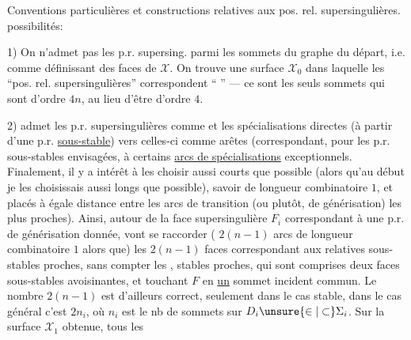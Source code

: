 Conventions particulières et constructions relatives aux pos. rel. supersingulières.  possibilités:


1) On n'admet pas les p.r. supersing. parmi les sommets du graphe du départ, i.e. comme définissant des faces de $\mathcal X$.
On trouve une surface $\mathcal X_0$ dans laquelle les ``pos. rel. supersingulières'' correspondent  `` '' --- ce sont les seuls sommets qui sont d'ordre $4n$, au lieu d'être d'ordre $4$.


2)  admet les p.r. supersingulières comme  et les spécialisations directes (à partir d'une p.r. \uline{sous-stable}) vers celles-ci comme arêtes (correspondant, pour les p.r. sous-stables envisagées, à certains \uline{arcs de spécialisations} exceptionnels.
Finalement, il y a intérêt à les choisir aussi courts que possible (alors qu'au début je les choisissais aussi longs que possible), savoir de longueur combinatoire $1$, et placés à égale distance entre les arcs de transition (ou plutôt, de générisation) les plus proches). Ainsi, autour de la face supersingulière $F_i$ correspondant à une p.r. de générisation donnée, vont se raccorder ( $2(n-1)$ arcs de longueur combinatoire $1$ alors que) les $2(n-1)$ faces correspondant aux  relatives sous-stables proches, sans compter les , stables proches, qui sont  comprises  deux faces sous-stables avoisinantes, et touchant $F$ en \uline{un} sommet incident commun. Le nombre $2(n-1)$ est d'ailleurs correct, seulement dans le cas stable, dans le cas général c'est $2n_i$, où $n_i$ est le nb de sommets sur $D_i\unsure{\in|\subset}\Sigma_i$. Sur la surface $\mathcal X_1$ obtenue, tous les

